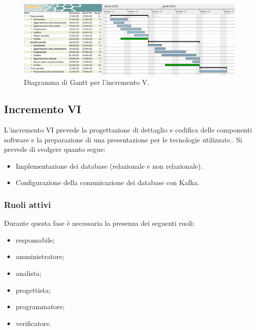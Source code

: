 		\begin{landscape}
          \begin{figure}[H]
            \centering
            \includegraphics[width=\linewidth]{images/ganttDettaglioCodifica} %
            \caption{Diagramma di Gantt per l'incremento V.}
          \end{figure}		
		\end{landscape}


		\subsection{Incremento VI}
			
			L'incremento VI prevede la progettazione di dettaglio e codifica delle componenti software e la preparazione di una presentazione per le tecnologie utilizzate.. Si prevede di svolgere quanto segue:
			\begin{itemize}
				\item Implementazione dei database (relazionale e non relazionale). 
				\item Configurazione della comunicazione dei database con Kafka.
			\end{itemize}
			
			\subsubsection{Ruoli attivi}
			
				Durante questa fase è necessaria la presenza dei seguenti ruoli:
				\begin{itemize}
					\item responsabile;
					\item amministratore;
					\item analista;
					\item progettista;
					\item programmatore;
					\item verificatore.
				\end{itemize}
			
